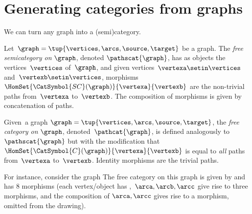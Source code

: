 
\section[Categories from graphs]{Generating categories from graphs}
\label{sec:catsfromgraphs}

We can turn any graph into a (semi)category.

\begin{ctdefinition}
    \label{def:free-semicategory}

    Let~$\graph=\tup{\vertices,\arcs,\source,\target}$ be a graph.
    The \emph{free semicategory on} $\graph$, denoted $\pathscat{\graph}$, has as objects the vertices~$\vertices$ of~$\graph$, and given vertices~$\vertexa\setin \vertices$ and~$\vertexb\setin \vertices$, morphisms~$\HomSet{\CatSymbol{SC}(\graph)}{\vertexa}{\vertexb}$ are the non-trivial paths from~$\vertexa$ to~$\vertexb$.
    The composition of morphisms is given by concatenation of paths.
\end{ctdefinition}

\begin{ctdefinition}
    \label{def:free-category}
    Given~a graph $\graph=\tup{\vertices,\arcs,\source,\target}$, the \emph{free category on} $\graph$, denoted~$\pathcat{\graph}$, is defined analogously to $\pathscat{\graph}$ but with the modification that $\HomSet{\CatSymbol{C}(\graph)}{\vertexa}{\vertexb}$ is equal to \emph{all} paths from~$\vertexa$ to~$\vertexb$.
    Identity morphisms are the trivial paths.
\end{ctdefinition}

For instance, consider the graph
%
%
The free category on this graph is given by
%
%
and has 8 morphisms (each vertex/object has ,~$\arca,\arcb,\arcc$ give rise to three morphisms, and the composition of $\arca,\arcc$ gives rise to a morphism, omitted from the drawing).

